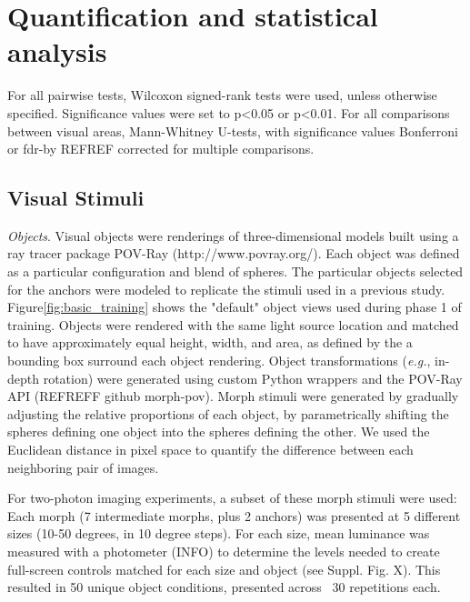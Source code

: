 \section{Quantification and statistical analysis}
For all pairwise tests, Wilcoxon signed-rank tests were used, unless otherwise specified. Significance values were set to p<0.05 or p<0.01. For all comparisons between visual areas, Mann-Whitney U-tests, with significance values Bonferroni or fdr-by REFREF corrected for multiple comparisons.



\subsection{Visual Stimuli}
\textit{Objects}. Visual objects were renderings of three-dimensional models built using a ray tracer package POV-Ray (http://www.povray.org/). Each object was defined as a particular configuration and blend of spheres. The particular objects selected for the anchors were modeled to replicate the stimuli used in a previous study\cite{Zoccolan2009}. Figure\ref{fig:basic_training} shows the "default" object views used during phase 1 of training. Objects were rendered with the same light source location and matched to have approximately equal height, width, and area, as defined by the a bounding box surround each object rendering. Object transformations (\textit{e.g.}, in-depth rotation) were generated using custom Python wrappers and the POV-Ray API (REFREFF github morph-pov). Morph stimuli were generated by gradually adjusting the relative proportions of each object, by parametrically shifting the spheres defining one object into the spheres defining the other. We used the Euclidean distance in pixel space to quantify the difference between each neighboring pair of images. 

For two-photon imaging experiments, a subset of these morph stimuli were used: Each morph (7 intermediate morphs, plus 2 anchors) was presented at 5 different sizes (10-50 degrees, in 10 degree steps). For each size, mean luminance was measured with a photometer (INFO) to determine the levels needed to create full-screen controls matched for each size and object (see Suppl. Fig. X). This resulted in 50 unique object conditions, presented across ~30 repetitions each.

